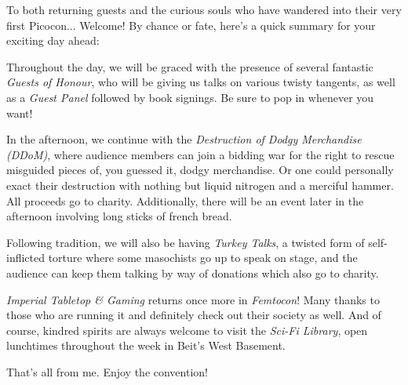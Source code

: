 To both returning guests and the curious souls who have wandered into their very first Picocon... Welcome! By chance or fate, here's a quick summary for your exciting day ahead:

Throughout the day, we will be graced with the presence of several fantastic \emph{Guests of Honour}, who will be giving us talks on various twisty tangents, as well as a \emph{Guest Panel} followed by book signings. Be sure to pop in whenever you want!

In the afternoon, we continue with the \emph{Destruction of Dodgy Merchandise (DDoM)}, where audience members can join a bidding war for the right to rescue misguided pieces of, you guessed it, dodgy merchandise. Or one could personally exact their destruction with nothing but liquid nitrogen and a merciful hammer. All proceeds go to charity. Additionally, there will be an event later in the afternoon involving long sticks of french bread.

Following tradition, we will also be having \emph{Turkey Talks}, a twisted form of self-inflicted torture where some masochists go up to speak on stage, and the audience can keep them talking by way of donations which also go to charity. 

\emph{Imperial Tabletop \& Gaming} returns once more in \emph{Femtocon}! Many thanks to those who are running it and definitely check out their society as well. And of course, kindred spirits are always welcome to visit the \emph{Sci-Fi Library}, open lunchtimes throughout the week in Beit's West Basement.

That's all from me. Enjoy the convention!

